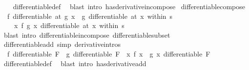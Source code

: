 \begin{isabellebody}
%
\isadelimproof
\ \ %
\endisadelimproof
%
\isatagproof
{}\isamarkupfalse%
\ differentiable{\isacharunderscore}{\kern0pt}def\ \isamarkupfalse%
\ {\isacharparenleft}{\kern0pt}blast\ intro{\isacharcolon}{\kern0pt}\ has{\isacharunderscore}{\kern0pt}derivative{\isacharunderscore}{\kern0pt}in{\isacharunderscore}{\kern0pt}compose{\isacharparenright}{\kern0pt}%
\endisatagproof
{\isafoldproof}%
%
\isadelimproof
\isanewline
%
\endisadelimproof
\isanewline
{}\isamarkupfalse%
\ differentiable{\isacharunderscore}{\kern0pt}compose{\isacharcolon}{\kern0pt}\isanewline
\ \ {\isachardoublequoteopen}f\ differentiable\ {\isacharparenleft}{\kern0pt}at\ {\isacharparenleft}{\kern0pt}g\ x{\isacharparenright}{\kern0pt}{\isacharparenright}{\kern0pt}\ {\isasymLongrightarrow}\ g\ differentiable\ {\isacharparenleft}{\kern0pt}at\ x\ within\ s{\isacharparenright}{\kern0pt}\ {\isasymLongrightarrow}\isanewline
\ \ \ \ {\isacharparenleft}{\kern0pt}{\isasymlambda}x{\isachardot}{\kern0pt}\ f\ {\isacharparenleft}{\kern0pt}g\ x{\isacharparenright}{\kern0pt}{\isacharparenright}{\kern0pt}\ differentiable\ {\isacharparenleft}{\kern0pt}at\ x\ within\ s{\isacharparenright}{\kern0pt}{\isachardoublequoteclose}\isanewline
%
\isadelimproof
\ \ %
\endisadelimproof
%
\isatagproof
{}\isamarkupfalse%
\ {\isacharparenleft}{\kern0pt}blast\ intro{\isacharcolon}{\kern0pt}\ differentiable{\isacharunderscore}{\kern0pt}in{\isacharunderscore}{\kern0pt}compose\ differentiable{\isacharunderscore}{\kern0pt}subset{\isacharparenright}{\kern0pt}%
\endisatagproof
{\isafoldproof}%
%
\isadelimproof
\isanewline
%
\endisadelimproof
\isanewline
{}\isamarkupfalse%
\ differentiable{\isacharunderscore}{\kern0pt}add\ {\isacharbrackleft}{\kern0pt}simp{\isacharcomma}{\kern0pt}\ derivative{\isacharunderscore}{\kern0pt}intros{\isacharbrackright}{\kern0pt}{\isacharcolon}{\kern0pt}\isanewline
\ \ {\isachardoublequoteopen}f\ differentiable\ F\ {\isasymLongrightarrow}\ g\ differentiable\ F\ {\isasymLongrightarrow}\ {\isacharparenleft}{\kern0pt}{\isasymlambda}x{\isachardot}{\kern0pt}\ f\ x\ {\isacharplus}{\kern0pt}\ g\ x{\isacharparenright}{\kern0pt}\ differentiable\ F{\isachardoublequoteclose}\isanewline
%
\isadelimproof
\ \ %
\endisadelimproof
%
\isatagproof
{}\isamarkupfalse%
\ differentiable{\isacharunderscore}{\kern0pt}def\ \isamarkupfalse%
\ {\isacharparenleft}{\kern0pt}blast\ intro{\isacharcolon}{\kern0pt}\ has{\isacharunderscore}{\kern0pt}derivative{\isacharunderscore}{\kern0pt}add{\isacharparenright}{\kern0pt}%
\endisatagproof

\end{isabellebody}
